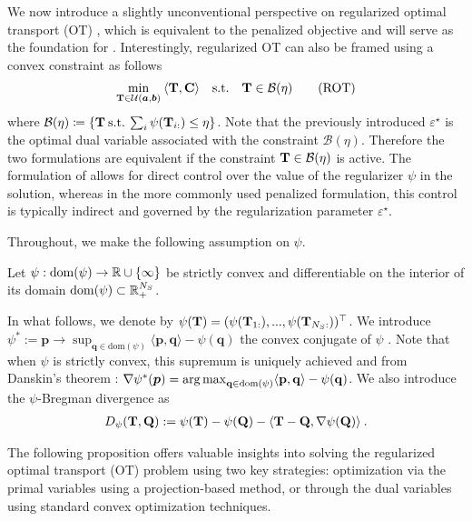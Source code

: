 We now introduce a slightly unconventional perspective on regularized optimal transport (OT) \citep{dessein2018regularized}, which is equivalent to the penalized objective and will serve as the foundation for .
Interestingly, regularized OT can also be framed using a convex constraint as follows
\begin{align}\label{eq:cot}
    \min_{{\mathbf{T}} \in {\mathcal{U}}(\bm{a}, \bm{b})} \: \langle {\mathbf{T}}, {\mathbf{C}} \rangle \quad \text{s.t.} \quad  {\mathbf{T}} \in \mathcal{B}(\eta)
    \tag{ROT}
\end{align}
where $\mathcal{B}(\eta) \coloneqq \{ {\mathbf{T}} \: \text{s.t.} \: \sum_i \psi({\mathbf{T}}_{i:}) \leq \eta \}$. Note that the previously introduced $\varepsilon^\star$ is the optimal dual variable associated with the constraint $\mathcal{B}(\eta)$. Therefore the two formulations are equivalent if the constraint ${\mathbf{T}} \in \mathcal{B}(\eta)$ is active. The formulation of  allows for direct control over the value of the regularizer \( \psi \) in the solution, whereas in the more commonly used penalized formulation, this control is typically indirect and governed by the regularization parameter \( \varepsilon^\star \).

Throughout, we make the following assumption on $\psi$.
\begin{assumption}\label{assumption_psi}
    Let $\psi: \mathrm{dom}(\psi) \to \mathbb{R} \cup \{\infty\}$ be strictly convex and differentiable on the interior of its domain $\mathrm{dom}(\psi) \subset \mathbb{R}^{N_S}_+$.
\end{assumption}

In what follows, we denote by $\psi({\mathbf{T}}) = (\psi({\mathbf{T}}_{1:}), ..., \psi({\mathbf{T}}_{N_S:}))^\top$.
We introduce $\psi^*:= \mathbf{p} \to \sup_{\mathbf{q} \in \mathrm{dom}(\psi)} \langle \mathbf{p}, \mathbf{q} \rangle - \psi(\mathbf{q})$ the convex conjugate of $\psi$ \citep{rockafellar1997convex}.
Note that when $\psi$ is strictly convex, this supremum is uniquely achieved and from Danskin's theorem \citep{danskin1966theory}: $\nabla \psi^*(\bm{p}) = \operatorname*{arg\,max}_{\mathbf{q} \in \mathrm{dom}(\psi)} \langle \mathbf{p}, \mathbf{q} \rangle - \psi(\mathbf{q})$. We also introduce the $\psi$-Bregman divergence as 
\begin{align}
    D_\psi({\mathbf{T}}, {\mathbf{Q}}) := \psi({\mathbf{T}}) - \psi({\mathbf{Q}}) - \langle {\mathbf{T}} - {\mathbf{Q}}, \nabla \psi({\mathbf{Q}}) \rangle \:.
\end{align} 

The following proposition offers valuable insights into solving the regularized optimal transport (OT) problem using two key strategies: optimization via the primal variables using a projection-based method, or through the dual variables using standard convex optimization techniques.

